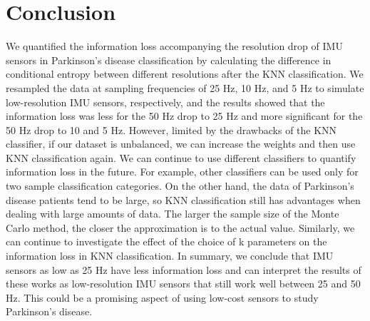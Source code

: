 \chapter{Conclusion}
We quantified the information loss accompanying the resolution drop of IMU sensors in Parkinson's disease classification by calculating the difference in conditional entropy between different resolutions after the KNN classification. We resampled the data at sampling frequencies of 25 Hz, 10 Hz, and 5 Hz to simulate low-resolution IMU sensors, respectively, and the results showed that the information loss was less for the 50 Hz drop to 25 Hz and more significant for the 50 Hz drop to 10 and 5 Hz. However, limited by the drawbacks of the KNN classifier, if our dataset is unbalanced, we can increase the weights and then use KNN classification again. We can continue to use different classifiers to quantify information loss in the future. For example, other classifiers can be used only for two sample classification categories.
On the other hand, the data of Parkinson's disease patients tend to be large, so KNN classification still has advantages when dealing with large amounts of data. The larger the sample size of the Monte Carlo method, the closer the approximation is to the actual value. Similarly, we can continue to investigate the effect of the choice of k parameters on the information loss in KNN classification. In summary, we conclude that IMU sensors as low as 25 Hz have less information loss and can interpret the results of these works as low-resolution IMU sensors that still work well between 25 and 50 Hz. This could be a promising aspect of using low-cost sensors to study Parkinson's disease.

